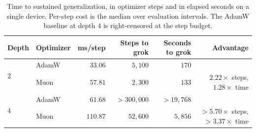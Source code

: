 \begin{table}[t]
\centering\small
\caption{Time to sustained generalization, in optimizer steps and in elapsed seconds on a
single device. Per-step cost is the median over evaluation intervals. The AdamW baseline at
depth $4$ is right-censored at the step budget.}
\label{tab:wallclock}
\begin{tabular}{llrrrr}
\toprule
Depth & Optimizer & ms/step & Steps to grok & Seconds to grok & Advantage \\
\midrule
\multirow{2}{*}{$2$} & AdamW & $33.06$ & $5{,}100$ & $170$ & \\
 & Muon & $57.81$ & $2{,}300$ & $133$ & $2.22\times$ steps, $1.28\times$ time \\
\midrule
\multirow{2}{*}{$4$} & AdamW & $61.68$ & $>300{,}000$ & $>19{,}768$ & \\
 & Muon & $110.87$ & $52{,}600$ & $5{,}856$ & $>5.70\times$ steps, $>3.37\times$ time \\
\bottomrule
\end{tabular}
\end{table}
